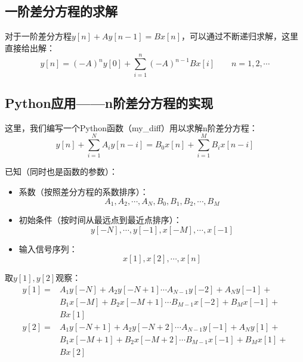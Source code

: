 \subsection{一阶差分方程的求解}

对于一阶差分方程$y\left[ n \right] +Ay\left[ n-1 \right] =Bx\left[ n \right] $，可以通过不断递归求解，这里直接给出解：
\[
y\left[ n \right] =\left( -A \right) ^ny\left[ 0 \right] +\sum_{i=1}^n{\left( -A \right) ^{n-1}Bx\left[ i \right]} \qquad n=1,2,\cdots
\]

\subsection{Python应用——n阶差分方程的实现}

这里，我们编写一个Python函数（my\_diff）用以求解n阶差分方程：
\[
y\left[ n \right] +\sum_{i=1}^N{A_iy\left[ n-i \right]}=B_0x\left[ n \right] +\sum_{i=1}^M{B_ix\left[ n-i \right]}
\]

已知（同时也是函数的参数）：
\begin{itemize}
    \item 系数（按照差分方程的系数排序）：
    \[
    A_1,A_2,\cdots ,A_N,B_0,B_1,B_2,\cdots ,B_M
    \]
    \item 初始条件（按时间从最远点到最近点排序）：
    \[
    y\left[ -N \right] ,\cdots ,y\left[ -1 \right] ,x\left[ -M \right] ,\cdots ,x\left[ -1 \right]
    \]
    \item 输入信号序列：
    \[
    x\left[ 1 \right] ,x\left[ 2 \right] ,\cdots ,x\left[ n \right]
    \]
\end{itemize}
取$y\left[ 1 \right] ,y\left[ 2 \right] $观察：
\begin{align*}
y\left[ 1 \right] =&A_1y\left[ -N \right] +A_2y\left[ -N+1 \right] \cdots A_{N-1}y\left[ -2 \right] +A_Ny\left[ -1 \right] + \\
&B_1x\left[ -M \right] +B_2x\left[ -M+1 \right] \cdots B_{M-1}x\left[ -2 \right] +B_Mx\left[ -1 \right] + \\
&Bx\left[ 1 \right] \\
y\left[ 2 \right] =&A_1y\left[ -N+1 \right] +A_2y\left[ -N+2 \right] \cdots A_{N-1}y\left[ -1 \right] +A_Ny\left[ 1 \right] + \\
&B_1x\left[ -M+1 \right] +B_2x\left[ -M+2 \right] \cdots B_{M-1}x\left[ -1 \right] +B_Mx\left[ 1 \right] + \\
&Bx\left[ 2 \right]
\end{align*}

